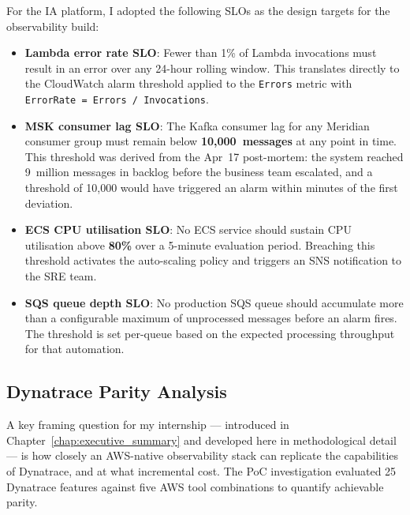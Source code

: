 For the IA platform, I adopted the following SLOs as the design
targets for the observability build:

\begin{itemize}
    \item \textbf{Lambda error rate SLO}: Fewer than 1\% of Lambda
          invocations must result in an error over any 24-hour rolling
          window. This translates directly to the CloudWatch alarm
          threshold applied to the \texttt{Errors} metric with
          \texttt{ErrorRate = Errors / Invocations}.

    \item \textbf{MSK consumer lag SLO}: The Kafka consumer lag for
          any Meridian consumer group must remain below
          \textbf{10,000~messages} at any point in time. This threshold
          was derived from the Apr~17 post-mortem: the system reached
          9~million messages in backlog before the business team
          escalated, and a threshold of 10,000 would have triggered an
          alarm within minutes of the first deviation.

    \item \textbf{ECS CPU utilisation SLO}: No ECS service should
          sustain CPU utilisation above \textbf{80\%} over a 5-minute
          evaluation period. Breaching this threshold activates the
          auto-scaling policy and triggers an SNS notification to the
          SRE team.

    \item \textbf{SQS queue depth SLO}: No production SQS queue should
          accumulate more than a configurable maximum of unprocessed
          messages before an alarm fires. The threshold is set per-queue
          based on the expected processing throughput for that
          automation.
\end{itemize}

\subsection{Dynatrace Parity Analysis}
\label{sec:dynatrace_parity}

A key framing question for my internship --- introduced in
Chapter~\ref{chap:executive_summary} and developed here in methodological
detail --- is how closely an AWS-native observability stack can replicate
the capabilities of Dynatrace, and at what incremental cost. The PoC
investigation evaluated 25 Dynatrace features against five AWS tool
combinations to quantify achievable parity.

